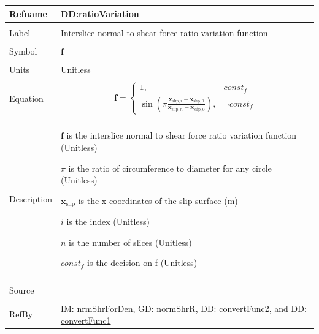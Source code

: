 \documentclass[12pt]{article}
\begin{document}
\vspace{\baselineskip}
\noindent
\begin{minipage}{\textwidth}
\begin{tabular}{>{\raggedright}p{}>{\raggedright\arraybackslash}p{}}
\toprule \textbf{Refname} & \textbf{DD:ratioVariation}
\label{DD:ratioVariation}
\\ \midrule \\
Label & Interslice normal to shear force ratio variation function
        
\\ \midrule \\
Symbol & $\mathbf{f}$
         
\\ \midrule \\
Units & Unitless
        
\\ \midrule \\
Equation & \begin{displaymath}
           \mathbf{f}=\begin{cases}
                      1, & const_f\\
                      \sin\left(π \frac{{\mathbf{x}_{\text{slip},i}}-{\mathbf{x}_{\text{slip},0}}}{{\mathbf{x}_{\text{slip},n}}-{\mathbf{x}_{\text{slip},0}}}\right), & \neg{}const_f
                      \end{cases}
           \end{displaymath}
\\ \midrule \\
Description & \begin{symbDescription}
              \item{$\mathbf{f}$ is the interslice normal to shear force ratio variation function (Unitless)}
              \item{$π$ is the ratio of circumference to diameter for any circle (Unitless)}
              \item{${\mathbf{x}_{\text{slip}}}$ is the x-coordinates of the slip surface (m)}
              \item{$i$ is the index (Unitless)}
              \item{$n$ is the number of slices (Unitless)}
              \item{$const_f$ is the decision on f (Unitless)}
              \end{symbDescription}
\\ \midrule \\
Source & \cite{fredlund1977}
         
\\ \midrule \\
RefBy & \hyperref[IM:nrmShrForDen]{IM: nrmShrForDen}, \hyperref[GD:normShrR]{GD: normShrR}, \hyperref[DD:convertFunc2]{DD: convertFunc2}, and \hyperref[DD:convertFunc1]{DD: convertFunc1}
        
\\ \bottomrule
\end{tabular}
\end{minipage}
\end{document}
